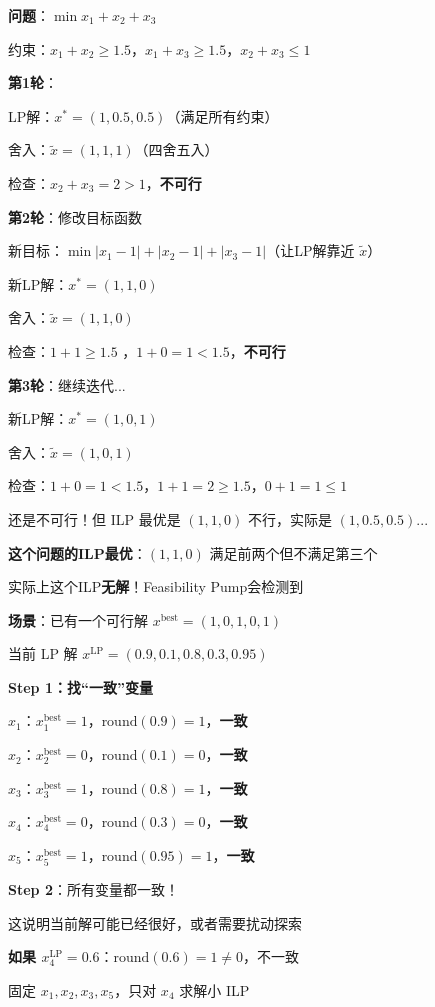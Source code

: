 \documentclass[12pt, a4paper]{ctexart}
\begin{document}
\begin{blackboard}

\textbf{问题}：$\min x_1 + x_2 + x_3$

约束：$x_1 + x_2 \geq 1.5$，$x_1 + x_3 \geq 1.5$，$x_2 + x_3 \leq 1$

\textbf{第1轮}：

LP解：$x^* = (1, 0.5, 0.5)$（满足所有约束）

舍入：$\tilde{x} = (1, 1, 1)$（四舍五入）

检查：$x_2 + x_3 = 2 > 1$，\textbf{不可行}

\textbf{第2轮}：修改目标函数

新目标：$\min |x_1 - 1| + |x_2 - 1| + |x_3 - 1|$（让LP解靠近 $\tilde{x}$）

新LP解：$x^* = (1, 1, 0)$

舍入：$\tilde{x} = (1, 1, 0)$

检查：$1 + 1 \geq 1.5$ \checkmark，$1 + 0 = 1 < 1.5$，\textbf{不可行}

\textbf{第3轮}：继续迭代...

新LP解：$x^* = (1, 0, 1)$

舍入：$\tilde{x} = (1, 0, 1)$

检查：$1+0=1 < 1.5$，$1+1=2 \geq 1.5$，$0+1=1 \leq 1$

还是不可行！但 ILP 最优是 $(1, 1, 0)$ 不行，实际是 $(1, 0.5, 0.5)$...

\textbf{这个问题的ILP最优}：$(1, 1, 0)$ 满足前两个但不满足第三个

实际上这个ILP\textbf{无解}！Feasibility Pump会检测到

\end{blackboard}

\begin{blackboard}

\textbf{场景}：已有一个可行解 $x^{\text{best}} = (1, 0, 1, 0, 1)$

当前 LP 解 $x^{\text{LP}} = (0.9, 0.1, 0.8, 0.3, 0.95)$

\textbf{Step 1：找``一致''变量}

$x_1$：$x^{\text{best}}_1 = 1$，$\text{round}(0.9) = 1$，\textbf{一致}

$x_2$：$x^{\text{best}}_2 = 0$，$\text{round}(0.1) = 0$，\textbf{一致}

$x_3$：$x^{\text{best}}_3 = 1$，$\text{round}(0.8) = 1$，\textbf{一致}

$x_4$：$x^{\text{best}}_4 = 0$，$\text{round}(0.3) = 0$，\textbf{一致}

$x_5$：$x^{\text{best}}_5 = 1$，$\text{round}(0.95) = 1$，\textbf{一致}

\textbf{Step 2}：所有变量都一致！

这说明当前解可能已经很好，或者需要扰动探索

\textbf{如果 $x_4^{\text{LP}} = 0.6$}：$\text{round}(0.6) = 1 \neq 0$，不一致

固定 $x_1, x_2, x_3, x_5$，只对 $x_4$ 求解小 ILP

\end{blackboard}
\end{document}
